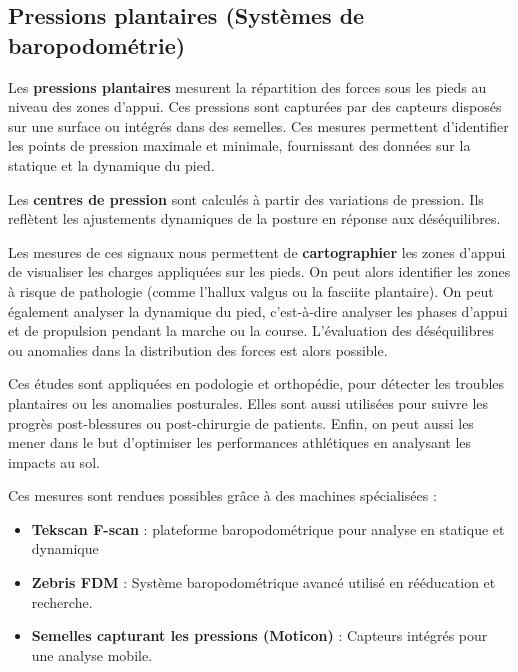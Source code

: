 \subsection{Pressions plantaires (Systèmes de baropodométrie)}

Les \textbf{pressions plantaires} mesurent la répartition des forces sous les pieds au niveau des zones d'appui. 
Ces pressions sont capturées par des capteurs disposés sur une surface ou intégrés dans des semelles.
Ces mesures permettent d'identifier les points de pression maximale et minimale, fournissant des données sur la statique et la dynamique du pied.

Les \textbf{centres de pression} sont calculés à partir des variations de pression. Ils reflètent les ajustements dynamiques de la posture en réponse aux déséquilibres.

Les mesures de ces signaux nous permettent de \textbf{cartographier} les zones d'appui de visualiser les charges appliquées sur les pieds. 
On peut alors identifier les zones à risque de pathologie (comme l'hallux valgus ou la fasciite plantaire).
On peut également analyser la dynamique du pied, c'est-à-dire analyser les phases d'appui et de propulsion pendant la marche ou la course.
L'évaluation des déséquilibres ou anomalies dans la distribution des forces est alors possible.

Ces études sont appliquées en podologie et orthopédie, pour détecter les troubles plantaires ou les anomalies posturales.
Elles sont aussi utilisées pour suivre les progrès post-blessures ou post-chirurgie de patients.
Enfin, on peut aussi les mener dans le but d'optimiser les performances athlétiques en analysant les impacts au sol.

Ces mesures sont rendues possibles grâce à des machines spécialisées : 
\begin{itemize}
  \item \textbf{Tekscan F-scan} : plateforme baropodométrique pour analyse en statique et dynamique
  \item \textbf{Zebris FDM} : Système baropodométrique avancé utilisé en rééducation et recherche.
  \item \textbf{Semelles capturant les pressions (Moticon)} : Capteurs intégrés pour une analyse mobile.
\end{itemize}

